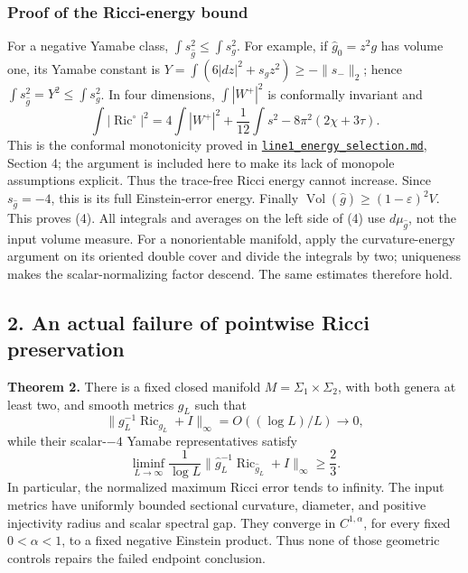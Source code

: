 \documentclass[
  11pt,
]{article}
\begin{document}
\hypertarget{proof-of-the-ricci-energy-bound}{%
\subsubsection{Proof of the Ricci-energy
bound}\label{proof-of-the-ricci-energy-bound}}

For a negative Yamabe class, \(\int s_{\widehat g}^2\le\int s_g^2\). For
example, if \(\widehat g_0=z^2g\) has volume one, its Yamabe constant is
\(Y=\int(6|dz|^2+s_gz^2)\ge-\|s_-\|_2\); hence
\(\int s_{\widehat g}^2=Y^2\le\int s_g^2\). In four dimensions,
\(\int|W^+|^2\) is conformally invariant and \[
 \int|\operatorname{Ric}^{\circ}|^2
 =4\int|W^+|^2+\frac1{12}\int s^2-8\pi^2(2\chi+3\tau).
 \tag{12}
\] This is the conformal monotonicity proved in
\href{line1_energy_selection.md}{\texttt{line1\_energy\_selection.md}},
Section 4; the argument is included here to make its lack of monopole
assumptions explicit. Thus the trace-free Ricci energy cannot increase.
Since \(s_{\widehat g}=-4\), this is its full Einstein-error energy.
Finally \(\operatorname{Vol}(\widehat g)\ge(1-\varepsilon)^2V\). This
proves (4). All integrals and averages on the left side of (4) use
\(d\mu_{\widehat g}\), not the input volume measure. For a nonorientable
manifold, apply the curvature-energy argument on its oriented double
cover and divide the integrals by two; uniqueness makes the
scalar-normalizing factor descend. The same estimates therefore hold.

\hypertarget{an-actual-failure-of-pointwise-ricci-preservation}{%
\subsection{2. An actual failure of pointwise Ricci
preservation}\label{an-actual-failure-of-pointwise-ricci-preservation}}

\textbf{Theorem 2.} There is a fixed closed manifold
\(M=\Sigma_1\times\Sigma_2\), with both genera at least two, and smooth
metrics \(g_L\) such that \[
 \|g_L^{-1}\operatorname{Ric}_{g_L}+I\|_\infty
       =O((\log L)/L)\to0,
 \tag{13}
\] while their scalar-\(-4\) Yamabe representatives satisfy \[
 \liminf_{L\to\infty}\frac1{\log L}
 \|\widehat g_L^{-1}\operatorname{Ric}_{\widehat g_L}+I\|_\infty
 \ge\frac23.
 \tag{14}
\] In particular, the normalized maximum Ricci error tends to infinity.
The input metrics have uniformly bounded sectional curvature, diameter,
and positive injectivity radius and scalar spectral gap. They converge
in \(C^{1,\alpha}\), for every fixed \(0<\alpha<1\), to a fixed negative
Einstein product. Thus none of those geometric controls repairs the
failed endpoint conclusion.
\end{document}
